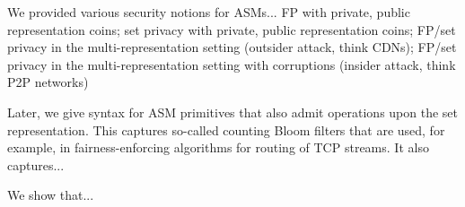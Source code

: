 We provided various security notions for ASMs... FP with private, public representation coins; set privacy with private, public representation coins; FP/set privacy in the multi-representation setting (outsider attack, think CDNs); FP/set privacy in the multi-representation setting with corruptions (insider attack, think P2P networks) 

Later, we give syntax for ASM primitives that also admit operations upon the set representation.  This captures so-called counting Bloom filters that are used, for example, in fairness-enforcing algorithms for routing of TCP streams.  It also captures... 

We show that... 











